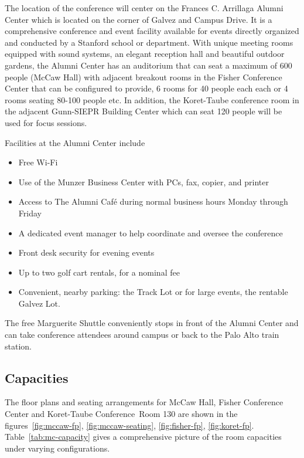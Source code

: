 \documentclass[11pt]{article}
\begin{document}
The location of the conference will center on the Frances C. Arrillaga
Alumni Center which is located on the corner of Galvez and Campus
Drive. It is a comprehensive conference and event facility available
for events directly organized and conducted by a Stanford school or
department. With unique meeting rooms equipped with sound systems, an
elegant reception hall and beautiful outdoor gardens, the Alumni
Center has an auditorium that can seat a maximum of 600 people (McCaw
Hall) with adjacent breakout rooms in the Fisher Conference Center
that can be configured to provide, 6 rooms for 40 people each each or
4 rooms seating 80-100 people etc. In addition, the Koret-Taube
conference room in the adjacent
Gunn-SIEPR Building Center which can seat 120 people will be used for
focus sessions.

Facilities at the Alumni Center include
\begin{itemize}
\item Free Wi-Fi
\item Use of the Munzer Business Center with PCs, fax, copier, and printer
\item Access to The Alumni Caf\'e during normal business hours Monday
  through Friday
\item A dedicated event manager to help coordinate and oversee the
  conference
\item Front desk security for evening events
\item Up to two golf cart rentals, for a nominal fee
\item Convenient, nearby parking: the Track Lot or for large events,
  the rentable Galvez Lot.
\end{itemize}
The free Marguerite Shuttle conveniently stops in front of the Alumni
Center and can take conference attendees around campus or back to the
Palo Alto train station.

\subsection*{Capacities}
The floor plans and seating arrangements for McCaw Hall, Fisher
Conference Center and Koret-Taube Conference~Room 130 are shown in the
figures~\ref{fig:mccaw-fp}, \ref{fig:mccaw-seating},
\ref{fig:fisher-fp}, \ref{fig:koret-fp}. Table~\ref{tab:mc-capacity}
gives a comprehensive picture of the room capacities under varying
configurations.
\end{document}

